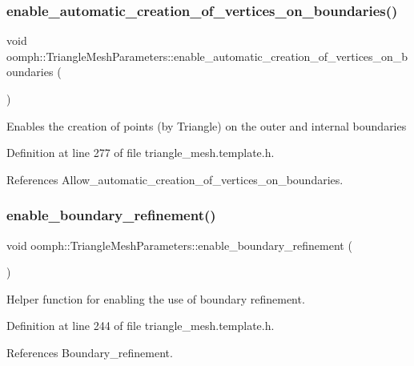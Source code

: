 \subsubsection{\texorpdfstring{enable\+\_\+automatic\+\_\+creation\+\_\+of\+\_\+vertices\+\_\+on\+\_\+boundaries()}{enable\_automatic\_creation\_of\_vertices\_on\_boundaries()}}
{\footnotesize\ttfamily void oomph\+::\+Triangle\+Mesh\+Parameters\+::enable\+\_\+automatic\+\_\+creation\+\_\+of\+\_\+vertices\+\_\+on\+\_\+boundaries (\begin{DoxyParamCaption}{ }\end{DoxyParamCaption})\hspace{0.3cm}{\ttfamily [inline]}}

Enables the creation of points (by Triangle) on the outer and internal boundaries 

Definition at line 277 of file triangle\+\_\+mesh.\+template.\+h.



References Allow\+\_\+automatic\+\_\+creation\+\_\+of\+\_\+vertices\+\_\+on\+\_\+boundaries.

\mbox{\label{classoomph_1_1TriangleMeshParameters_ae4761dd4f0b977eed13510e6b56ae61e}} 
\subsubsection{\texorpdfstring{enable\+\_\+boundary\+\_\+refinement()}{enable\_boundary\_refinement()}}
{\footnotesize\ttfamily void oomph\+::\+Triangle\+Mesh\+Parameters\+::enable\+\_\+boundary\+\_\+refinement (\begin{DoxyParamCaption}{ }\end{DoxyParamCaption})\hspace{0.3cm}{\ttfamily [inline]}}



Helper function for enabling the use of boundary refinement. 



Definition at line 244 of file triangle\+\_\+mesh.\+template.\+h.



References Boundary\+\_\+refinement.

